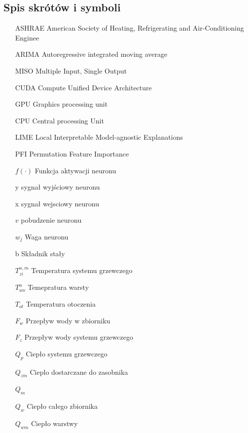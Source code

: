 \documentclass[a4paper,twoside,12pt]{book}
\begin{document}
\backmatter

\printbibliography           %

\begin{appendices}

	\chapter{Spis skrótów i symboli}

	\begin{itemize}
		\item[ASHRAE] American Society of Heating, Refrigerating and Air-Conditioning Enginee
		\item[ARIMA] Autoregressive integrated moving average
		\item[MISO] Multiple Input, Single Output
		\item[CUDA] Compute Unified Device Architecture
		\item[GPU] Graphics processing unit
		\item[CPU] Central processing Unit
		\item[LIME] Local Interpretable Model-agnostic Explanations
		\item[PFI] Permutation Feature Importance
		\item[$f(\cdot)$] Funkcja aktywacji neuronu
		\item[y] sygnał wyjściowy neuronu
		\item[x] sygnał wejsciowy neuronu
		\item[$v$] pobudzenie neuronu
		\item[$w_j$]  Waga neuronu
		\item[b] Składnik stały
		\item[$T_{zi}^{n,m}$] Temperatura systemu grzewczego
		\item[$T_{wo}^{n}$] Temepratura warsty
		\item[$T_{ot}$] Temperatura otoczenia
		\item[$F_w$] Przepływ wody w zbiorniku
		\item[$F_z$] Przepływ wody systemu grzewczego
		\item[$Q_p$] Ciepło systemu grzewczego
		\item[$Q_{zm}$] Cieplo dostarczane do zasobnika
		\item[$Q_m$]
		\item[$Q_w$] Ciepło całego zbiornika
		\item[$Q_{wm}$] Ciepło warstwy

\end{itemize}
\end{appendices}
\end{document}
